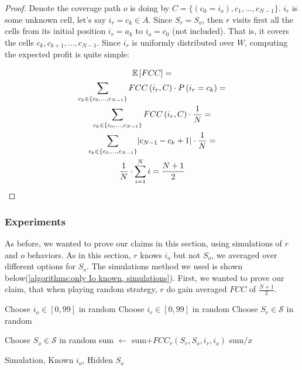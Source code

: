 \documentclass[a4paper,10pt]{article}
\newcommand\rob{\ensuremath{r}\xspace}
\newcommand\opp{\ensuremath{o}\xspace}
\newcommand{\w}{\ensuremath{W}\xspace}
\newcommand{\fcc}{\ensuremath{FCC}\xspace}
\DeclarePairedDelimiter\abs{\lvert}{\rvert}%
\begin{document}
\begin{proof}
Denote the coverage path \opp is doing by $C=\lbrace(c_0=i_{\opp}),c_1,...,c_{N-1}\rbrace$. $i_{\rob}$ is some unknown cell, let's say $i_{\rob}=c_k \in A$. Since $S_{\rob}=S_{\opp}$, then \rob visits first all the cells from its initial position $i_r=a_k$ to $i_{\opp}=c_0$ (not included). That is, it covers the cells $c_k,c_{k+1},\ldots,c_{N-1}$.
Since $i_{\rob}$ is uniformly distributed over \w, computing the expected profit is quite simple:

\begin{multline*}
\mathbb{E}\left[\fcc\right]=\\
\sum_{c_k\in\lbrace c_0,...,c_{N-1}\rbrace}\fcc\left(i_{\rob},C\right)\cdot P\left(i_{\rob}=c_k\right)=\\
\sum_{c_k\in\lbrace c_0,...,c_{N-1}\rbrace}\fcc\left(i_{\rob},C\right)\cdot \frac{1}{N}=\\
\sum_{c_k\in\lbrace c_0,...,c_{N-1}\rbrace}\abs*{c_{N-1}-c_k+1}\cdot \frac{1}{N}=\\
\frac{1}{N}\cdot \sum_{i=1}^{N}{i}=\frac{N+1}{2}
\end{multline*}

\end{proof}

\subsubsection{Experiments}
As before, we wanted to prove our claims in this section, using simulations of \rob and \opp behaviors.
As in this section, \rob knows $i_{\opp}$ but not $S_{\opp}$, we averaged over different options for $S_{\opp}$. The simulations method we used is shown below(\ref{algorithms:only Io known, simulations}). First, we wanted to prove our claim, that when playing random strategy, \rob do gain averaged \fcc of $\frac{N+1}{2}$. 
\begin{algorithm}
\begin{algorithmic}
	\STATE Choose $i_{\opp} \in \left[0,99\right]$ in random
    \STATE Choose $i_{\rob} \in \left[0,99\right]$ in random
    \STATE Choose $S_{\rob} \in \mathcal{S}$ in random
    
        \STATE Choose $S_{\opp} \in \mathcal{S}$ in random
    	\STATE sum $\leftarrow $ sum$+ {\fcc}_{\rob}(S_{\rob},S_{\opp}, i_{\rob}, i_{\opp})$
    \ENDFOR
    \RETURN sum$/x$
  
\end{algorithmic}
\caption{Simulation, Known $i_{\opp}$, Hidden $S_{\opp}$\label{algorithms:only Io known, simulations}}
\end{algorithm}
\end{document}
